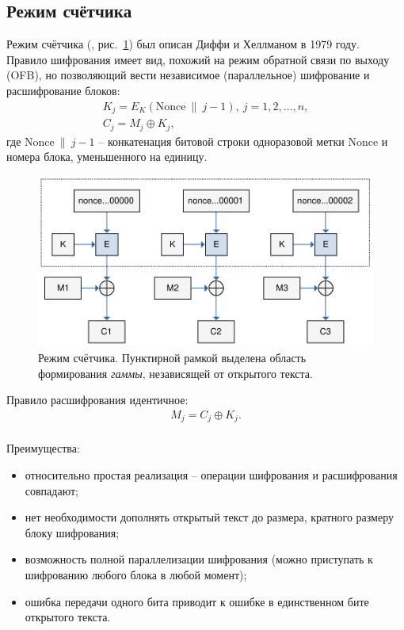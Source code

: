 \subsection{Режим счётчика}

Режим счётчика (, рис.~\ref{fig:CTR}) был описан Диффи и Хеллманом в 1979 году.~\cite{Diffie:Hellman:1979} Правило шифрования имеет вид, похожий на режим обратной связи по выходу (OFB), но позволяющий вести независимое (параллельное) шифрование и расшифрование блоков:
\[ \begin{array}{l}
    K_j = E_K(\textrm{Nonce} ~\|~ j - 1), ~ j = 1, 2, \dots, n, \\
    C_j = M_j \oplus K_j,
\end{array} \]
где $\textrm{Nonce} ~\|~ j - 1$ -- конкатенация битовой строки одноразовой метки $\textrm{Nonce}$ и номера блока, уменьшенного на единицу.

\begin{figure}[bt]
	\centering
	\includegraphics[width=1\textwidth]{pic/CTR}
	\caption{Режим счётчика. Пунктирной рамкой выделена область формирования \emph{гаммы}, независящей от открытого текста.}
	\label{fig:CTR}
\end{figure}

Правило расшифрования идентичное:
\[ \begin{array}{l}
    M_j = C_j \oplus K_j. \\
\end{array} \]

Преимущества:
\begin{itemize}
	\item относительно простая реализация -- операции шифрования и расшифрования совпадают;
	\item нет необходимости дополнять открытый текст до размера, кратного размеру блоку шифрования;
	\item возможность полной параллелизации шифрования (можно приступать к шифрованию любого блока в любой момент);
	\item ошибка передачи одного бита приводит к ошибке в единственном бите открытого текста.
\end{itemize}

